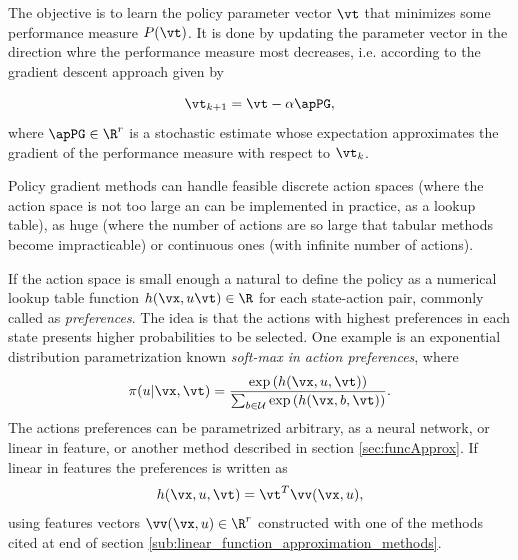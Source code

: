 The objective is to learn the policy parameter vector $\vt$ that minimizes some performance measure $P(\vt)$. It is done by updating the parameter vector in the direction whre the performance measure most decreases, i.e.
according to the gradient descent approach given by 

\begin{equation}
\vt_{k+1} = \vt - \alpha \apPG
\label{eq:PGpar},
\end{equation}
where $\apPG \in \R^r$ is a stochastic estimate whose expectation approximates the gradient of the performance measure with respect to $\vt_k$.

Policy gradient methods can handle feasible discrete action spaces (where the action space is not too large an can be implemented in practice, as a lookup table), as huge  (where the number of actions are so large that tabular methods become impracticable) or continuous ones (with infinite number of actions).

If the action space is small enough a natural to define the policy as a numerical lookup table function $h(\vx,u\vt) \in \R$ for each state-action pair, commonly called as \textit{preferences}.
The idea is that the actions with highest preferences in each state presents higher probabilities to be selected. 
One example is an exponential distribution parametrization known \textit{soft-max in action preferences}, where
\begin{equation}
  \pi(u|\vx,\vt) = \frac{\exp{\left(h(\vx,u,\vt)\right)}}{\sum_{b \in \mathcal{U}} \exp{\left(h(\vx,b,\vt)\right)}}
\label{eq:softmax}.
\end{equation}
The actions preferences can be parametrized arbitrary, as a neural network, or linear in feature, or another method described in section \eqref{sec:funcApprox}.
If linear in features the preferences is written as
\begin{equation}
  h(\vx,u,\vt) = \vt^T\vv(\vx,u),
\end{equation}
using features vectors $\vv(\vx,u) \in \R^r$ constructed with one of the methods cited at end of section \eqref{sub:linear_function_approximation_methods}.

